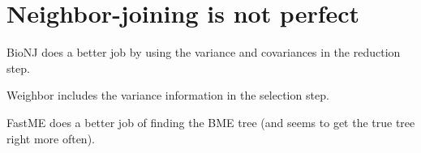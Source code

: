 \documentclass[landscape]{foils}
\begin{document}
\myNewSlide
\section*{Neighbor-joining is not perfect}
\begin{compactitem}
	\item BioNJ \citep{Gascuel1997} does a better job by using the variance and covariances in the reduction step.
	\item Weighbor \citep{BrunoSH2000} includes the variance information in the selection step.
	\item FastME \citep{DesperG2002,DesperG2004} does a better job of finding the BME tree (and seems to get the true tree right more often).
\end{compactitem}


\myNewSlide

\end{document}

